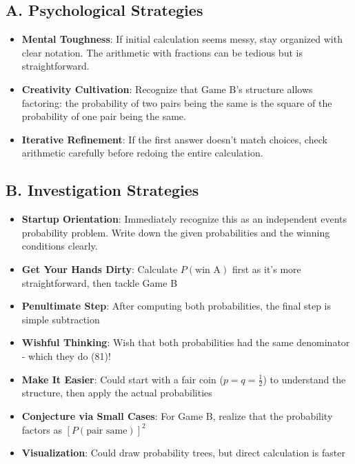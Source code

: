 \documentclass[]{article}
\begin{document}
\begin{strategicbox}
\subsection*{A. Psychological Strategies}
\begin{itemize}[leftmargin=*]
    \item \textbf{Mental Toughness}: If initial calculation seems messy, stay organized with clear notation. The arithmetic with fractions can be tedious but is straightforward.
    \item \textbf{Creativity Cultivation}: Recognize that Game B's structure allows factoring: the probability of two pairs being the same is the square of the probability of one pair being the same.
    \item \textbf{Iterative Refinement}: If the first answer doesn't match choices, check arithmetic carefully before redoing the entire calculation.
\end{itemize}

\subsection*{B. Investigation Strategies}
\begin{itemize}[leftmargin=*]
    \item \textbf{Startup Orientation}: Immediately recognize this as an independent events probability problem. Write down the given probabilities and the winning conditions clearly.
    \item \textbf{Get Your Hands Dirty}: Calculate $P(\text{win A})$ first as it's more straightforward, then tackle Game B
    \item \textbf{Penultimate Step}: After computing both probabilities, the final step is simple subtraction
    \item \textbf{Wishful Thinking}: Wish that both probabilities had the same denominator - which they do (81)!
    \item \textbf{Make It Easier}: Could start with a fair coin ($p = q = \frac{1}{2}$) to understand the structure, then apply the actual probabilities
    \item \textbf{Conjecture via Small Cases}: For Game B, realize that the probability factors as $[P(\text{pair same})]^2$
    \item \textbf{Visualization}: Could draw probability trees, but direct calculation is faster
\end{itemize}


\end{strategicbox}
\end{document}
